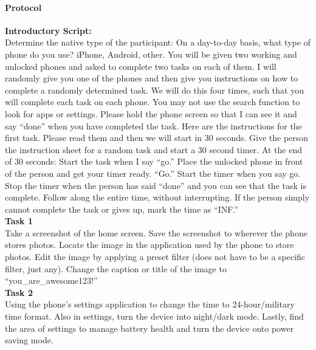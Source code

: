 \documentclass[conference]{IEEEtran}
\begin{document}
\paragraph{Protocol}
\hfill\break \noindent \textbf{Introductory Script:} \\
Determine the native type of the participant: On a day-to-day basis, what type of phone do you use? iPhone, Android, other.
You will be given two working and unlocked phones and asked to complete two tasks on each of them. I will randomly give you one of the phones and then give you instructions on how to complete a randomly determined task. We will do this four times, such that you will complete each task on each phone. You may not use the search function to look for apps or settings. Please hold the phone screen so that I can see it and say “done” when you have completed the task. 
Here are the instructions for the first task. Please read them and then we will start in 30 seconds. Give the person the instruction sheet for a random task and start a 30 second timer. 
At the end of 30 seconds: Start the task when I say “go.” Place the unlocked phone in front of the person and get your timer ready. “Go.” Start the timer when you say go. 
Stop the timer when the person has said “done” and you can see that the task is complete. Follow along the entire time, without interrupting. If the person simply cannot complete the task or gives up, mark the time as “INF.”  \\ 
\textbf{Task 1} \\
Take a screenshot of the home screen.
Save the screenshot to wherever the phone stores photos.
Locate the image in the application used by the phone to store photos.
Edit the image by applying a preset filter (does not have to be a specific filter, just any).
Change the caption or title of the image to “you\_are\_awesome123!” \\
\textbf{Task 2} \\ 
Using the phone’s settings application to change the time to 24-hour/military time format.
Also in settings, turn the device into night/dark mode.
Lastly, find the area of settings to manage battery health and turn the device onto power saving mode.
\end{document}
